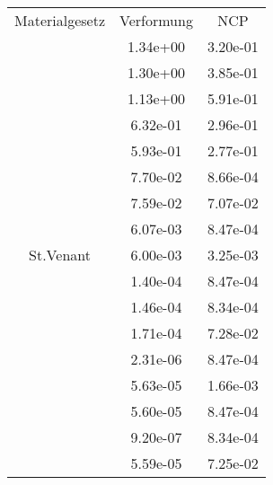 \begin{table} 
\centering 
\begin{tabular}{c|cc|} 
\cline{2-3} 
 &  \\ 
\hline 
\multicolumn{1}{|c|}{Materialgesetz} & \multicolumn{1}{c|}{Verformung} & \multicolumn{1}{c|}{NCP} \\ 
\hline 
\multicolumn{1}{|c|}{\multirow{101}{*}{St.Venant}} &\multicolumn{1}{|c|}{  1.34e+00} & \multicolumn{1}{|c|}{  3.20e-01} \\ 
\multicolumn{1}{|c|}{} & \multicolumn{1}{|c|}{  1.30e+00} & \multicolumn{1}{|c|}{  3.85e-01} \\ 
\multicolumn{1}{|c|}{} & \multicolumn{1}{|c|}{  1.13e+00} & \multicolumn{1}{|c|}{  5.91e-01} \\ 
\multicolumn{1}{|c|}{} & \multicolumn{1}{|c|}{  6.32e-01} & \multicolumn{1}{|c|}{  2.96e-01} \\ 
\multicolumn{1}{|c|}{} & \multicolumn{1}{|c|}{  5.93e-01} & \multicolumn{1}{|c|}{  2.77e-01} \\ 
\multicolumn{1}{|c|}{} & \multicolumn{1}{|c|}{  7.70e-02} & \multicolumn{1}{|c|}{  8.66e-04} \\ 
\multicolumn{1}{|c|}{} & \multicolumn{1}{|c|}{  7.59e-02} & \multicolumn{1}{|c|}{  7.07e-02} \\ 
\multicolumn{1}{|c|}{} & \multicolumn{1}{|c|}{  6.07e-03} & \multicolumn{1}{|c|}{  8.47e-04} \\ 
\multicolumn{1}{|c|}{} & \multicolumn{1}{|c|}{  6.00e-03} & \multicolumn{1}{|c|}{  3.25e-03} \\ 
\multicolumn{1}{|c|}{} & \multicolumn{1}{|c|}{  1.40e-04} & \multicolumn{1}{|c|}{  8.47e-04} \\ 
\multicolumn{1}{|c|}{} & \multicolumn{1}{|c|}{  1.46e-04} & \multicolumn{1}{|c|}{  8.34e-04} \\ 
\multicolumn{1}{|c|}{} & \multicolumn{1}{|c|}{  1.71e-04} & \multicolumn{1}{|c|}{  7.28e-02} \\ 
\multicolumn{1}{|c|}{} & \multicolumn{1}{|c|}{  2.31e-06} & \multicolumn{1}{|c|}{  8.47e-04} \\ 
\multicolumn{1}{|c|}{} & \multicolumn{1}{|c|}{  5.63e-05} & \multicolumn{1}{|c|}{  1.66e-03} \\ 
\multicolumn{1}{|c|}{} & \multicolumn{1}{|c|}{  5.60e-05} & \multicolumn{1}{|c|}{  8.47e-04} \\ 
\multicolumn{1}{|c|}{} & \multicolumn{1}{|c|}{  9.20e-07} & \multicolumn{1}{|c|}{  8.34e-04} \\ 
\multicolumn{1}{|c|}{} & \multicolumn{1}{|c|}{  5.59e-05} & \multicolumn{1}{|c|}{  7.25e-02} \\ 

\end{tabular}
\end{table}
